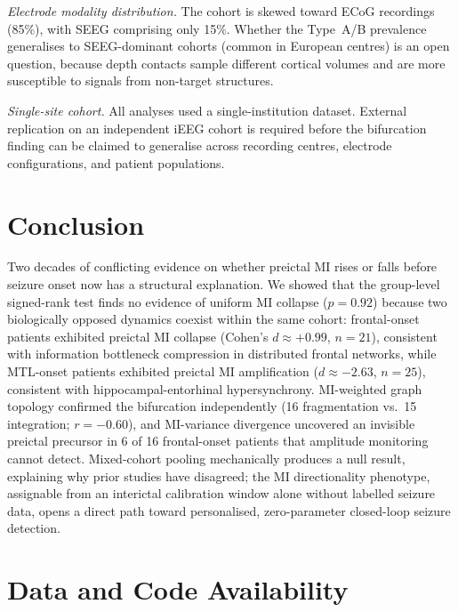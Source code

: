 \documentclass[a4paper,fleqn]{cas-dc}
\begin{document}
\textit{Electrode modality distribution.}
The cohort is skewed toward ECoG recordings (85\%), with SEEG comprising
only 15\%.
%
Whether the Type~A/B prevalence generalises to SEEG-dominant cohorts
(common in European centres) is an open question, because depth contacts
sample different cortical volumes and are more susceptible to signals
from non-target structures.

\textit{Single-site cohort.}
All analyses used a single-institution dataset.
%
External replication on an independent iEEG cohort is required before
the bifurcation finding can be claimed to generalise across recording
centres, electrode configurations, and patient populations.

\section{Conclusion}
\label{sec:conclusion}

Two decades of conflicting evidence on whether preictal MI rises or
falls before seizure onset now has a structural explanation.
%
We showed that the group-level signed-rank test finds no evidence of
uniform MI collapse ($p = 0.92$) because two biologically opposed
dynamics coexist within the same cohort: frontal-onset patients
exhibited preictal MI collapse (Cohen's $d \approx +0.99$, $n = 21$),
consistent with information bottleneck compression in distributed frontal
networks, while MTL-onset patients exhibited preictal MI amplification
($d \approx -2.63$, $n = 25$), consistent with
hippocampal-entorhinal hypersynchrony.
%
MI-weighted graph topology confirmed the bifurcation independently
(16 fragmentation vs.\ 15 integration; $r = -0.60$), and MI-variance
divergence uncovered an invisible preictal precursor in 6 of 16
frontal-onset patients that amplitude monitoring cannot detect.
%
Mixed-cohort pooling mechanically produces a null result, explaining
why prior studies have disagreed; the MI directionality phenotype,
assignable from an interictal calibration window alone without labelled
seizure data, opens a direct path toward personalised, zero-parameter
closed-loop seizure detection.

\section*{Data and Code Availability}
\end{document}
